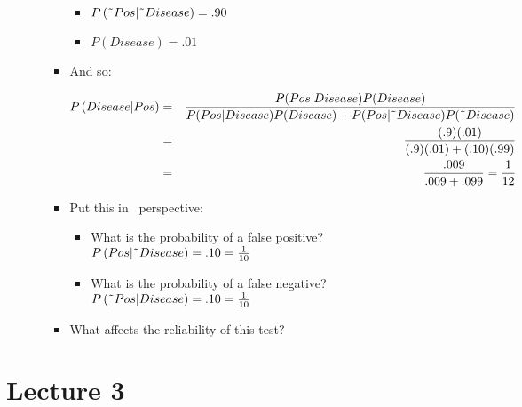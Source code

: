 \documentclass[11pt]{article}
\begin{document}
\begin{itemize}
\begin{itemize}
\begin{itemize}
\begin{itemize}
\item $P\left( \symbol{126}Pos|\symbol{126}Disease\right) =.90$

\item $P\left( Disease\right) =.01$
\end{itemize}

\item And so:

\begin{eqnarray*}
P\left( Disease|Pos\right) &=&\frac{P(Pos|Disease)P(Disease)}{%
P(Pos|Disease)P(Disease)+P(Pos|\symbol{126}Disease)P(\symbol{126}Disease)} \\
&=&\frac{(.9)(.01)}{(.9)(.01)+(.10)(.99)} \\
&=&\frac{.009}{.009+.099}=\frac{1}{12}
\end{eqnarray*}

\item Put this in \ perspective:

\begin{itemize}
\item What is the probability of a false positive? $P\left( Pos|\symbol{126}%
Disease\right) =.10=\frac{1}{10}$

\item What is the probability of a false negative? \ $P\left( \symbol{126}%
Pos|Disease\right) =.10=\frac{1}{10}$
\end{itemize}

\item What affects the reliability of this test?\newpage
\end{itemize}
\end{itemize}
\end{itemize}

\section{Lecture 3}
\end{document}
